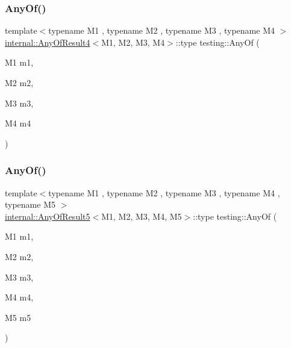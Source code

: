 \mbox{\label{namespacetesting_a1cfcacf2cf19543b86445e3585d5356f}} 
\subsubsection{\texorpdfstring{Any\+Of()}{AnyOf()}\hspace{0.1cm}{\footnotesize\ttfamily [3/9]}}
{\footnotesize\ttfamily template$<$typename M1 , typename M2 , typename M3 , typename M4 $>$ \\
\hyperlink{structtesting_1_1internal_1_1_any_of_result4}{internal\+::\+Any\+Of\+Result4}$<$M1, M2, M3, M4$>$\+::type testing\+::\+Any\+Of (\begin{DoxyParamCaption}\item[{M1}]{m1,  }\item[{M2}]{m2,  }\item[{M3}]{m3,  }\item[{M4}]{m4 }\end{DoxyParamCaption})\hspace{0.3cm}{\ttfamily [inline]}}

\mbox{\label{namespacetesting_a049ea436e52c242adc44b2b42dc03e50}} 
\subsubsection{\texorpdfstring{Any\+Of()}{AnyOf()}\hspace{0.1cm}{\footnotesize\ttfamily [4/9]}}
{\footnotesize\ttfamily template$<$typename M1 , typename M2 , typename M3 , typename M4 , typename M5 $>$ \\
\hyperlink{structtesting_1_1internal_1_1_any_of_result5}{internal\+::\+Any\+Of\+Result5}$<$M1, M2, M3, M4, M5$>$\+::type testing\+::\+Any\+Of (\begin{DoxyParamCaption}\item[{M1}]{m1,  }\item[{M2}]{m2,  }\item[{M3}]{m3,  }\item[{M4}]{m4,  }\item[{M5}]{m5 }\end{DoxyParamCaption})\hspace{0.3cm}{\ttfamily [inline]}}

